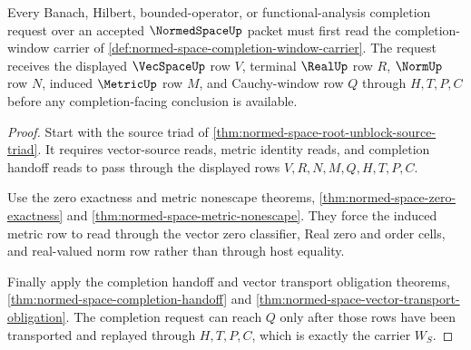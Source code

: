 \begin{theorem}
\label{thm:normed-space-cauchy-window-handoff}
Every Banach, Hilbert, bounded-operator, or functional-analysis completion request over an accepted $\NormedSpaceUp$ packet must first read the completion-window carrier of \autoref{def:normed-space-completion-window-carrier}. The request receives the displayed $\VecSpaceUp$ row $V$, terminal $\RealUp$ row $R$, $\NormUp$ row $N$, induced $\MetricUp$ row $M$, and Cauchy-window row $Q$ through $H,T,P,C$ before any completion-facing conclusion is available.
\end{theorem}
\begin{proof}
Start with the source triad of \autoref{thm:normed-space-root-unblock-source-triad}. It requires vector-source reads, metric identity reads, and completion handoff reads to pass through the displayed rows $V,R,N,M,Q,H,T,P,C$.

Use the zero exactness and metric nonescape theorems, \autoref{thm:normed-space-zero-exactness} and \autoref{thm:normed-space-metric-nonescape}. They force the induced metric row to read through the vector zero classifier, Real zero and order cells, and real-valued norm row rather than through host equality.

Finally apply the completion handoff and vector transport obligation theorems, \autoref{thm:normed-space-completion-handoff} and \autoref{thm:normed-space-vector-transport-obligation}. The completion request can reach $Q$ only after those rows have been transported and replayed through $H,T,P,C$, which is exactly the carrier $W_S$.
\end{proof}

